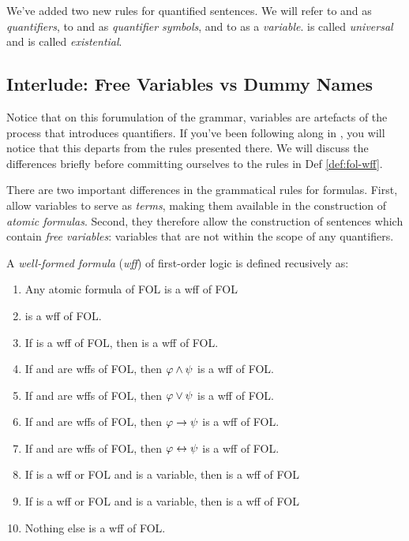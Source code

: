We've added two new rules for quantified sentences. We will refer to
\eforall\exi and \eexists\exi as \emph{quantifiers}, to \eforall and \eexists
as \emph{quantifier symbols}, and to \exi as a \emph{variable}. \eforall\exi is
called \emph{universal} and \eexists is called \emph{existential}.

\subsection{Interlude: Free Variables vs Dummy Names}
\label{sec:fol-free-variables}

Notice that on this forumulation of the grammar, variables are artefacts of the
process that introduces quantifiers. If you've been following along in
\cite{Mag25}, you will notice that this departs from the rules presented there.
We will discuss the differences briefly before committing ourselves to the rules
in Def \ref{def:fol-wff}.

There are two important differences in the grammatical rules for formulas.
First, \cite{Mag25} allow variables to serve as \emph{terms}, making them
available in the construction of \emph{atomic formulas}. Second, they therefore
allow the construction of sentences which contain \emph{free variables}:
variables that are not within the scope of any quantifiers.

\begin{definition}
  \label{def:fol-wff-mag25}
  A \emph{well-formed formula} (\emph{wff}) of first-order logic is defined
    recusively as:\\
    \begin{enumerate}
    \item Any atomic formula of FOL is a wff of FOL
    \item \ebot is a wff  of FOL.
    \item If \ephi is a wff of FOL, then \enot\ephi is a wff of FOL.
    \item If \ephi and \epsi are wffs of FOL, then $\varphi\wedge\psi$ is a
      wff of FOL.
    \item If \ephi and \epsi are wffs of FOL, then $\varphi\vee\psi$ is a
      wff of FOL.
    \item If \ephi and \epsi are wffs of FOL, then $\varphi\rightarrow\psi$ is a
      wff of FOL.
    \item If \ephi and \epsi are wffs of FOL, then $\varphi\leftrightarrow\psi$ is a
      wff of FOL.
    \item If \ephi is a wff or FOL and \exi is a variable, then
      \eforall\exi\ephi is a wff of FOL
    \item If \ephi is a wff or FOL and \exi is a variable, then
      \eexists\exi\ephi is a wff of FOL
    \item Nothing else is a wff of FOL.
    \end{enumerate}
\end{definition}

